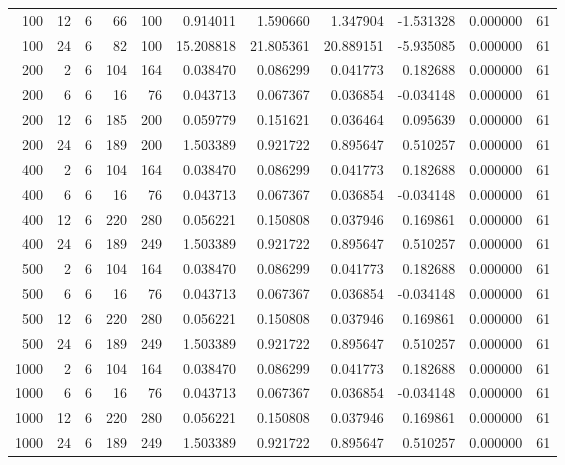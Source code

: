 \begin{table}
\begin{tabular}{rrrrrrrrrrr}
100 & 12 & 6 & 66 & 100 & 0.914011 & 1.590660 & 1.347904 & -1.531328 & 0.000000 & 61 \\
100 & 24 & 6 & 82 & 100 & 15.208818 & 21.805361 & 20.889151 & -5.935085 & 0.000000 & 61 \\
200 & 2 & 6 & 104 & 164 & 0.038470 & 0.086299 & 0.041773 & 0.182688 & 0.000000 & 61 \\
200 & 6 & 6 & 16 & 76 & 0.043713 & 0.067367 & 0.036854 & -0.034148 & 0.000000 & 61 \\
200 & 12 & 6 & 185 & 200 & 0.059779 & 0.151621 & 0.036464 & 0.095639 & 0.000000 & 61 \\
200 & 24 & 6 & 189 & 200 & 1.503389 & 0.921722 & 0.895647 & 0.510257 & 0.000000 & 61 \\
400 & 2 & 6 & 104 & 164 & 0.038470 & 0.086299 & 0.041773 & 0.182688 & 0.000000 & 61 \\
400 & 6 & 6 & 16 & 76 & 0.043713 & 0.067367 & 0.036854 & -0.034148 & 0.000000 & 61 \\
400 & 12 & 6 & 220 & 280 & 0.056221 & 0.150808 & 0.037946 & 0.169861 & 0.000000 & 61 \\
400 & 24 & 6 & 189 & 249 & 1.503389 & 0.921722 & 0.895647 & 0.510257 & 0.000000 & 61 \\
500 & 2 & 6 & 104 & 164 & 0.038470 & 0.086299 & 0.041773 & 0.182688 & 0.000000 & 61 \\
500 & 6 & 6 & 16 & 76 & 0.043713 & 0.067367 & 0.036854 & -0.034148 & 0.000000 & 61 \\
500 & 12 & 6 & 220 & 280 & 0.056221 & 0.150808 & 0.037946 & 0.169861 & 0.000000 & 61 \\
500 & 24 & 6 & 189 & 249 & 1.503389 & 0.921722 & 0.895647 & 0.510257 & 0.000000 & 61 \\
1000 & 2 & 6 & 104 & 164 & 0.038470 & 0.086299 & 0.041773 & 0.182688 & 0.000000 & 61 \\
1000 & 6 & 6 & 16 & 76 & 0.043713 & 0.067367 & 0.036854 & -0.034148 & 0.000000 & 61 \\
1000 & 12 & 6 & 220 & 280 & 0.056221 & 0.150808 & 0.037946 & 0.169861 & 0.000000 & 61 \\
1000 & 24 & 6 & 189 & 249 & 1.503389 & 0.921722 & 0.895647 & 0.510257 & 0.000000 & 61 \\
\bottomrule
\end{tabular}
\end{table}
